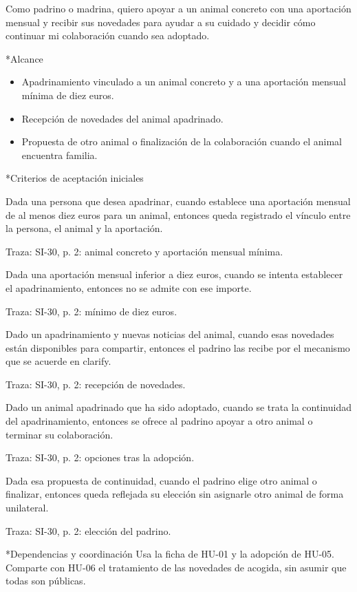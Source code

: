 \documentclass[10pt,a4paper]{article}
\makeatletter
\newcommand{\apartado}{\@startsection{subsection}{2}{\z@}{7pt}{3pt}{\normalfont\normalsize\bfseries\color{verde}}*}
\newenvironment{criterios}{\begin{description}[style=nextline,leftmargin=0pt,labelsep=0pt,font=\bfseries\color{verde},itemsep=5pt,topsep=3pt,parsep=0pt]}{\end{description}}
\newcommand{\historia}[1]{\begingroup\setlength{\fboxsep}{10pt}\colorbox{suave}{\parbox{\dimexpr\linewidth-20pt\relax}{#1}}\endgroup}
\newcommand{\traza}[1]{{\footnotesize\color{gris}Traza: SI-30, #1.}}
\newcommand{\HU}[1]{\mbox{HU-#1}}
\makeatother
\begin{document}
\historia{Como padrino o madrina, quiero apoyar a un animal concreto con una aportación mensual y recibir sus novedades para ayudar a su cuidado y decidir cómo continuar mi colaboración cuando sea adoptado.}
\apartado{Alcance}
\begin{itemize}
\item Apadrinamiento vinculado a un animal concreto y a una aportación mensual mínima de diez euros.
\item Recepción de novedades del animal apadrinado.
\item Propuesta de otro animal o finalización de la colaboración cuando el animal encuentra familia.
\end{itemize}
\apartado{Criterios de aceptación iniciales}
\begin{criterios}
\item[CA-08-01] Dada una persona que desea apadrinar, cuando establece una aportación mensual de al menos diez euros para un animal, entonces queda registrado el vínculo entre la persona, el animal y la aportación.\par\traza{p. 2: animal concreto y aportación mensual mínima}
\item[CA-08-02] Dada una aportación mensual inferior a diez euros, cuando se intenta establecer el apadrinamiento, entonces no se admite con ese importe.\par\traza{p. 2: mínimo de diez euros}
\item[CA-08-03] Dado un apadrinamiento y nuevas noticias del animal, cuando esas novedades están disponibles para compartir, entonces el padrino las recibe por el mecanismo que se acuerde en clarify.\par\traza{p. 2: recepción de novedades}
\item[CA-08-04] Dado un animal apadrinado que ha sido adoptado, cuando se trata la continuidad del apadrinamiento, entonces se ofrece al padrino apoyar a otro animal o terminar su colaboración.\par\traza{p. 2: opciones tras la adopción}
\item[CA-08-05] Dada esa propuesta de continuidad, cuando el padrino elige otro animal o finalizar, entonces queda reflejada su elección sin asignarle otro animal de forma unilateral.\par\traza{p. 2: elección del padrino}
\end{criterios}
\apartado{Dependencias y coordinación}
Usa la ficha de \HU{01} y la adopción de \HU{05}. Comparte con \HU{06} el tratamiento de las novedades de acogida, sin asumir que todas son públicas.
\end{document}
